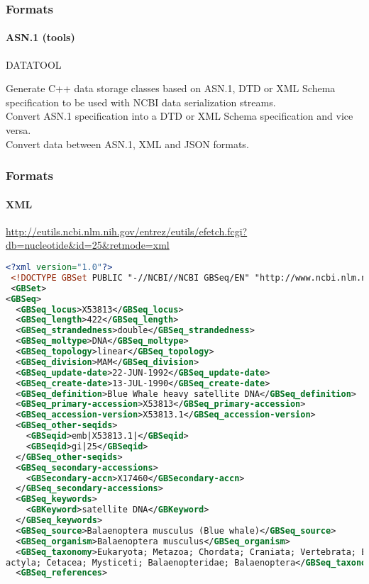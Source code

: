 \documentclass{beamer}
\begin{document}
\begin{frame}[fragile]
\frametitle{Formats}
\framesubtitle{ASN.1 (tools)}
\begin{center}
DATATOOL
\end{center}
Generate C++ data storage classes based on ASN.1, DTD or XML Schema specification to be used with NCBI data serialization streams.\\
Convert ASN.1 specification into a DTD or XML Schema specification and vice versa.\\
Convert data between ASN.1, XML and JSON formats.\\
\end{frame}

\begin{frame}[fragile]
\frametitle{Formats}
\framesubtitle{XML}
\url{http://eutils.ncbi.nlm.nih.gov/entrez/eutils/efetch.fcgi?db=nucleotide&id=25&retmode=xml}
\begin{lstlisting}[language=xml,basicstyle=\tiny,breaklines=false]
<?xml version="1.0"?>
 <!DOCTYPE GBSet PUBLIC "-//NCBI//NCBI GBSeq/EN" "http://www.ncbi.nlm.nih.gov/dtd/NCBI_GBSeq.dtd">
 <GBSet>
<GBSeq>
  <GBSeq_locus>X53813</GBSeq_locus>
  <GBSeq_length>422</GBSeq_length>
  <GBSeq_strandedness>double</GBSeq_strandedness>
  <GBSeq_moltype>DNA</GBSeq_moltype>
  <GBSeq_topology>linear</GBSeq_topology>
  <GBSeq_division>MAM</GBSeq_division>
  <GBSeq_update-date>22-JUN-1992</GBSeq_update-date>
  <GBSeq_create-date>13-JUL-1990</GBSeq_create-date>
  <GBSeq_definition>Blue Whale heavy satellite DNA</GBSeq_definition>
  <GBSeq_primary-accession>X53813</GBSeq_primary-accession>
  <GBSeq_accession-version>X53813.1</GBSeq_accession-version>
  <GBSeq_other-seqids>
    <GBSeqid>emb|X53813.1|</GBSeqid>
    <GBSeqid>gi|25</GBSeqid>
  </GBSeq_other-seqids>
  <GBSeq_secondary-accessions>
    <GBSecondary-accn>X17460</GBSecondary-accn>
  </GBSeq_secondary-accessions>
  <GBSeq_keywords>
    <GBKeyword>satellite DNA</GBKeyword>
  </GBSeq_keywords>
  <GBSeq_source>Balaenoptera musculus (Blue whale)</GBSeq_source>
  <GBSeq_organism>Balaenoptera musculus</GBSeq_organism>
  <GBSeq_taxonomy>Eukaryota; Metazoa; Chordata; Craniata; Vertebrata; Euteleostomi; Mammalia; Eutheria; Laurasiatheria; Cetartiod
actyla; Cetacea; Mysticeti; Balaenopteridae; Balaenoptera</GBSeq_taxonomy>
  <GBSeq_references>
\end{lstlisting}
\end{frame}
\end{document}
